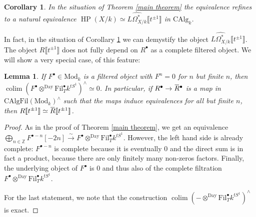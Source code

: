 \documentclass[10pt, reqno]{amsart}
\newtheorem{lemma}[theorem]{Lemma}
\newtheorem{corollary}[theorem]{Corollary}
\theoremstyle{definition}
\theoremstyle{remark}
\newcommand{\Z}{\mathbb{Z}}
\newcommand{\CAlg}{\mathrm{CAlg}}
\newcommand{\dr}[3]{\Omega^{#3}_{#1/#2}}
\DeclareMathOperator{\colim}{\mathrm{colim}}
\newcommand{\Fil}{\mathrm{Fil}}
\newcommand{\essLaur}{\llbracket t^{\pm1}\rrbracket}
\newcommand{\Mod}{\mathrm{Mod}}
\newcommand{\Day}{\mathrm{Day}}
\DeclareMathOperator{\HP}{\mathrm{HP}}
\newcommand{\lbar}[1]{\mkern 1.5mu\overline{\mkern-1.5mu#1\mkern-1.5mu}\mkern 1.5mu}
\begin{document}
\begin{corollary}\label{maincor}
	In the situation of Theorem \ref{main theorem} the equivalence refines to a natural equivalence $\HP(X/k)\simeq \widehat{L\dr Xk*}\essLaur$ in $\CAlg_k$.
\end{corollary}

In fact, in the situation of Corollary \ref{maincor} we can demystify the object $\widehat{L\dr Xk*}\essLaur$. 
The object $R\essLaur$ does not fully depend on $R^\bullet$ as a complete filtered object. We will show a very special case, of this feature:


\begin{lemma}\label{middle}
	If $F^\bullet\in \Mod_k$ is a filtered object with $F^n=0$ for $n$ but finite $n$, then $\colim(F^\bullet\otimes^\Day\Fil_T^\bullet k^{tS^1})^\wedge \simeq 0$. In particular, if $R^\bullet\to \lbar R^\bullet$ is a map in $\CAlg\Fil(\Mod_k)^\wedge$ such that the maps induce equivalences for all but finite $n$, then $R\essLaur\simeq \lbar R\essLaur$.
\end{lemma}

\begin{proof}
	As in the proof of Theorem \ref{main theorem}, we get an equivalence
	$\bigoplus_{n\in\Z}F^{\bullet-n}[-2n]\xrightarrow\sim F^\bullet\otimes^\Day\Fil_T^\bullet k^{tS^1}$. However, the left hand side is already complete: $F^{\bullet-n}$ is complete because it is eventually 0 and the direct sum is in fact a product, because there are only finitely many non-zeros factors. Finally, the underlying object of $F^\bullet $ is 0 and thus also of the complete filtration $F^\bullet\otimes^\Day\Fil_T^\bullet k^{tS^1}$.
	
	For the last statement, we note that the construction $\colim(-\otimes^\Day\Fil_T^\bullet k^{tS^1})^\wedge$ is exact.
\end{proof}
\end{document}
